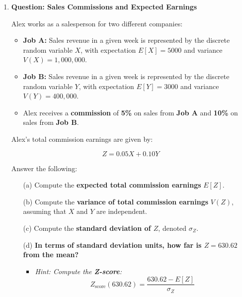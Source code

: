 \documentclass{article}
\newcommand{\blankbox}[2][3cm]{%
    \vspace{-0.5em}
    \begin{figure}[H]
        \makebox[\linewidth]{%
            \begin{tcolorbox}[
                colback=white,
                colframe=black,
                width=#2, %
                height=#1,
                boxrule=0.2mm
            ]
            \end{tcolorbox}
        }
    \end{figure}
    \vspace{-1em}
}
\begin{document}
\begin{enumerate}
    \item \textbf{Question: Sales Commissions and Expected Earnings}

    Alex works as a salesperson for two different companies:
    \begin{itemize}
        \item \textbf{Job A:} Sales revenue in a given week is represented by the discrete random variable \( X \), with expectation \( E[X] = 5000 \) and variance \( V(X) = 1,000,000 \).
        \item \textbf{Job B:} Sales revenue in a given week is represented by the discrete random variable \( Y \), with expectation \( E[Y] = 3000 \) and variance \( V(Y) = 400,000 \).
        \item Alex receives a \textbf{commission} of \textbf{5\%} on sales from \textbf{Job A} and \textbf{10\%} on sales from \textbf{Job B}.
    \end{itemize}

    Alex’s total commission earnings are given by:

    \[
    Z = 0.05X + 0.10Y
    \]

    Answer the following:

    \begin{enumerate}
        \item[(a)] Compute the \textbf{expected total commission earnings} \( E[Z] \).
        \blankbox[5cm]{1.1\textwidth}

        \item[(b)] Compute the \textbf{variance of total commission earnings} \( V(Z) \), assuming that \( X \) and \( Y \) are independent.
        \blankbox[5cm]{1.1\textwidth}

        \item[(c)] Compute the \textbf{standard deviation of \( Z \)}, denoted \( \sigma_Z \).
        \blankbox[5cm]{1.1\textwidth}

        \item[(d)] \textbf{In terms of standard deviation units, how far is \( Z = 630.62 \) from the mean?}
        \begin{itemize}
            \item \emph{Hint: Compute the \textbf{Z-score}:}
            \[
            Z_{\text{score}}(630.62) = \frac{630.62 - E[Z]}{\sigma_Z}
            \]
        \end{itemize}
        \blankbox[5cm]{1.1\textwidth}


\end{enumerate}
\end{enumerate}
\end{document}
